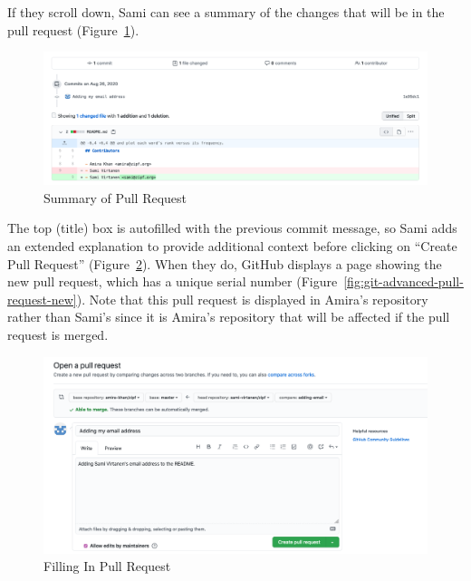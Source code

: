 \documentclass[
]{krantz}
\begin{document}
If they scroll down,
Sami can see a summary of the changes that will be in the pull request
(Figure~\ref{fig:git-advanced-pull-request-summary}).

\begin{figure}

{\centering \includegraphics[width=1\linewidth]{figures/git-advanced/open-pull-request-detail} 

}

\caption{Summary of Pull Request}\label{fig:git-advanced-pull-request-summary}
\end{figure}

The top (title) box is autofilled with the previous commit message,
so Sami adds an extended explanation to provide additional context
before clicking on ``Create Pull Request''
(Figure~\ref{fig:git-advanced-pull-request-fill-in}).
When they do,
GitHub displays a page showing the new pull request,
which has a unique serial number
(Figure~\ref{fig:git-advanced-pull-request-new}).
Note that this pull request is displayed in Amira's repository rather than Sami's
since it is Amira's repository that will be affected if the pull request is merged.

\begin{figure}

{\centering \includegraphics[width=1\linewidth]{figures/git-advanced/fill-in-pull-request} 

}

\caption{Filling In Pull Request}\label{fig:git-advanced-pull-request-fill-in}
\end{figure}
\end{document}
